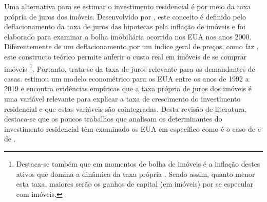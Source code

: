 Uma alternativa para se estimar o investimento residencial é por meio da taxa própria de juros dos imóveis. 
Desenvolvido por \textcite{teixeira_crescimento_2015}, este conceito é definido pelo deflacionamento da taxa de juros das hipotecas pela inflação de imóveis e foi elaborado para examinar a bolha imobiliária ocorrida nos EUA nos anos 2000.
Diferentemente de um deflacionamento por um índice geral de preços, como faz \textcite{fair_macroeconometric_2013}, este constructo teórico permite  auferir o custo real em imóveis de se comprar imóveis \cite[p.~53]{teixeira_crescimento_2015}\footnote{Destaca-se também que em momentos de bolha de imóveis é a inflação destes ativos que domina a dinâmica da taxa própria \cite[p.~53]{teixeira_crescimento_2015}. Sendo assim, quanto menor esta taxa, maiores serão os ganhos de capital (em imóveis) por se especular com imóveis.}. 
Portanto, trata-se da taxa de juros relevante para os demandantes de casas.
\textcite{petrini_demanda_2019} estimou um modelo econométrico para os EUA entre os anos de 1992 a 2019 e encontra evidências empíricas que a taxa própria de juros dos imóveis é uma variável relevante para explicar a taxa de crescimento do investimento residencial e que estas variáveis são cointegradas.
Desta revisão de literatura, destaca-se que  os poucos trabalhos que analisam os determinantes do investimento residencial têm examinado os EUA em específico como é o caso de \textcite{teixeira_crescimento_2015} e de \textcite{petrini_demanda_2019}. 

